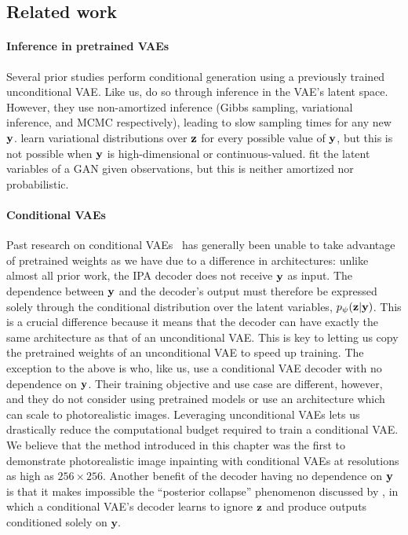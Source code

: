 \subsection{Related work}
\paragraph{Inference in pretrained VAEs}
Several prior studies perform conditional generation using a previously trained
unconditional VAE.
%
Like us, \citet{rezende2014stochastic,nguyen2016plug,wu2018conditional} do so
through inference in the VAE's latent space. However, they use non-amortized
inference (Gibbs sampling, variational inference, and MCMC respectively),
leading to slow sampling times for any new ${\mathbf{y}}$.
%
\citet{duan2019pre} learn variational distributions over ${\mathbf{z}}$ for every possible
value of ${\mathbf{y}}$, but this is not possible when ${\mathbf{y}}$ is
high-dimensional or continuous-valued.
%
\citet{yeh2017semantic} fit the latent variables of a GAN given observations,
but this is neither amortized nor probabilistic.
%

\paragraph{Conditional VAEs}
Past research on conditional
VAEs~\citep{sohn2015learning,zheng2019pluralistic,ivanov2018variational,wan2021high}
has generally been unable to take advantage of pretrained weights as we have due
to a difference in architectures: unlike almost all prior work, the IPA decoder
does not receive ${\mathbf{y}}$ as input. The dependence between ${\mathbf{y}}$ and the
decoder's output must therefore be expressed solely through the conditional
distribution over the latent variables, $p_\psi({\mathbf{z}}|{\mathbf{y}})$. This is a crucial
difference because it means that the decoder can have exactly the same
architecture as that of an unconditional VAE. This is key to letting us copy the
pretrained weights of an unconditional VAE to speed up training. The exception
to the above is \citet{ma2018eddi} who, like us, use a conditional VAE decoder
with no dependence on ${\mathbf{y}}$. Their training objective and use case are
different, however, and they do not consider using pretrained models or use an
architecture which can scale to photorealistic images. Leveraging unconditional
VAEs lets us drastically reduce the computational budget required to train a
conditional VAE. We believe that the method introduced in this chapter was the first to demonstrate photorealistic image inpainting with conditional VAEs at resolutions as high as
$256\times256$.
% 
Another benefit of the decoder having no dependence on ${\mathbf{y}}$ is that it
makes impossible the ``posterior collapse'' phenomenon discussed by
\citet{zheng2019pluralistic}, in which a conditional VAE's decoder learns to
ignore ${\mathbf{z}}$ and produce outputs conditioned solely on $\mathbf{y}$.


